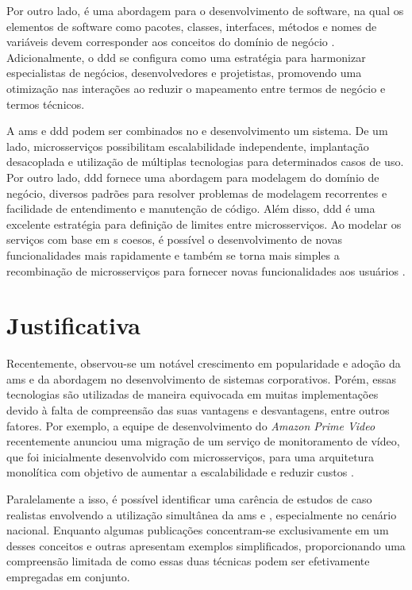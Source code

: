 Por outro lado,  é uma abordagem para o desenvolvimento de software, na qual os elementos de software como pacotes, classes, interfaces, métodos e nomes de variáveis devem corresponder aos conceitos do domínio de negócio \cite{dddFowler}. Adicionalmente, o \acrshort{ddd} se configura como uma estratégia para harmonizar especialistas de negócios, desenvolvedores e projetistas, promovendo uma otimização nas interações ao reduzir o mapeamento entre termos de negócio e termos técnicos.

A \acrfull{ams} e \acrshort{ddd} podem ser combinados no  e desenvolvimento um sistema. De um lado, microsserviços possibilitam escalabilidade independente, implantação desacoplada e utilização de múltiplas tecnologias para determinados casos de uso. Por outro lado, \acrshort{ddd} fornece uma abordagem para modelagem do domínio de negócio, diversos padrões para resolver problemas de modelagem recorrentes e facilidade de entendimento e manutenção de código. Além disso, \acrshort{ddd} é uma excelente estratégia para definição de limites entre microsserviços. Ao modelar os serviços com base em s coesos, é possível o desenvolvimento de novas funcionalidades mais rapidamente e também se torna mais simples a recombinação de microsserviços para fornecer novas funcionalidades aos usuários \cite{buildingMicroservices}.

\section{Justificativa}

Recentemente, observou-se um notável crescimento em popularidade e adoção da \acrshort{ams} e da abordagem  no desenvolvimento de sistemas corporativos. Porém, essas tecnologias são utilizadas de maneira equivocada em muitas implementações devido à falta de compreensão das suas vantagens e desvantagens, entre outros fatores. Por exemplo, a equipe de desenvolvimento do \emph{Amazon Prime Video} recentemente anunciou uma migração de um serviço de monitoramento de vídeo, que foi inicialmente desenvolvido com microsserviços, para uma arquitetura monolítica com objetivo de aumentar a escalabilidade e reduzir custos \cite{amazonBackMigration}.

Paralelamente a isso, é possível identificar uma carência de estudos de caso realistas envolvendo a utilização simultânea da \acrshort{ams} e , especialmente no cenário nacional.  Enquanto algumas publicações concentram-se exclusivamente em um desses conceitos e outras apresentam exemplos simplificados, proporcionando uma compreensão limitada de como essas duas técnicas podem ser efetivamente empregadas em conjunto. 

